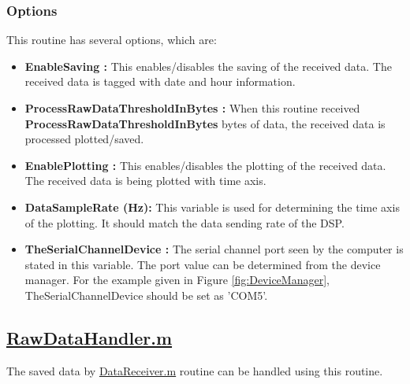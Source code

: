 \documentclass{article}
\begin{document}
\subsubsection{Options}
\label{subsubsection:Options}
This routine has several options, which are:
\begin{itemize}
	\item \textbf{EnableSaving :} This enables/disables the saving of the received data. The received data is tagged with date and hour information.
	\item \textbf{ProcessRawDataThresholdInBytes :} When this routine received \textbf{ProcessRawDataThresholdInBytes} bytes of data, the received data is processed plotted/saved.
	\item \textbf{EnablePlotting :} This enables/disables the plotting of the received data. The received data is being plotted with time axis. 
	\item \textbf{DataSampleRate (Hz):} This variable is used for determining the time axis of the plotting. It should match the data sending rate of the DSP.
	\item \textbf{TheSerialChannelDevice :} The serial channel port seen by the computer is stated in this variable. The port value can be determined from the device manager. For the example given in Figure \ref{fig:DeviceManager}, TheSerialChannelDevice should be set as 'COM5'.
\end{itemize}

\subsection{\href{https://github.com/hakansrc/fault_tolerant_drives/blob/master/Software/MultipleDataPlot/RawDataHandler.m}{RawDataHandler.m}}
The saved data by \href{https://github.com/hakansrc/fault_tolerant_drives/blob/master/Software/MultipleDataPlot/DataReceiver.m}{DataReceiver.m} routine can be handled using this routine.
\end{document}
